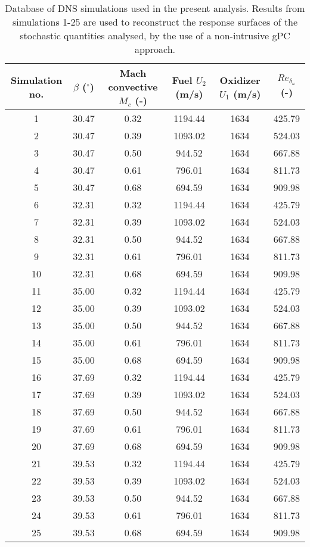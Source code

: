\documentclass[conf]{new-aiaa}
\begin{document}
\begin{table}[!ht]
\centering \footnotesize
\begin{tabular}{| c | c | c | c | c | c |}
\hline\hline
Simulation no. & $\beta$ ($^\circ$) & 	Mach convective $M_c$ (-) & Fuel $U_2$ (m/s) & Oxidizer $U_1$ (m/s) & ${Re_{\delta_{\omega}}}$ (-)\\ \hline\hline
1	& 30.47	& 0.32	& 1194.44	& 1634	& 425.79 \\
2	& 30.47	& 0.39	& 1093.02	& 1634	& 524.03 \\
3	& 30.47	& 0.50	& 944.52	& 1634	& 667.88 \\
4	& 30.47	& 0.61	& 796.01	& 1634	& 811.73 \\
5	& 30.47	& 0.68	& 694.59	& 1634	& 909.98 \\
6	& 32.31	& 0.32	& 1194.44	& 1634	& 425.79 \\
7	& 32.31	& 0.39	& 1093.02	& 1634	& 524.03 \\
8	& 32.31	& 0.50	& 944.52	& 1634	& 667.88 \\
9	& 32.31	& 0.61	& 796.01	& 1634	& 811.73 \\
10	& 32.31	& 0.68	& 694.59	& 1634	& 909.98 \\
11	& 35.00	& 0.32	& 1194.44	& 1634	& 425.79 \\
12	& 35.00	& 0.39	& 1093.02	& 1634	& 524.03 \\
13	& 35.00	& 0.50	& 944.52	& 1634	& 667.88 \\
14	& 35.00	& 0.61	& 796.01	& 1634	& 811.73 \\
15	& 35.00	& 0.68	& 694.59	& 1634	& 909.98 \\
16	& 37.69	& 0.32	& 1194.44	& 1634	& 425.79 \\
17	& 37.69	& 0.39	& 1093.02	& 1634	& 524.03 \\
18	& 37.69	& 0.50	& 944.52	& 1634	& 667.88 \\
19	& 37.69	& 0.61	& 796.01	& 1634	& 811.73 \\
20	& 37.69	& 0.68	& 694.59	& 1634	& 909.98 \\
21	& 39.53	& 0.32	& 1194.44	& 1634	& 425.79 \\
22	& 39.53	& 0.39	& 1093.02	& 1634	& 524.03 \\
23	& 39.53	& 0.50	& 944.52	& 1634	& 667.88 \\
24	& 39.53	& 0.61	& 796.01	& 1634	& 811.73 \\
25	& 39.53	& 0.68	& 694.59	& 1634	& 909.98 \\
\hline \hline
\end{tabular}
\caption{Database of DNS simulations used in the present analysis. Results from
simulations 1-25 are used to reconstruct the response surfaces of the stochastic quantities
analysed, by the use of a non-intrusive gPC approach.}
\label{tab:config-mel-couche-cis-1}
\end{table}
\end{document}
